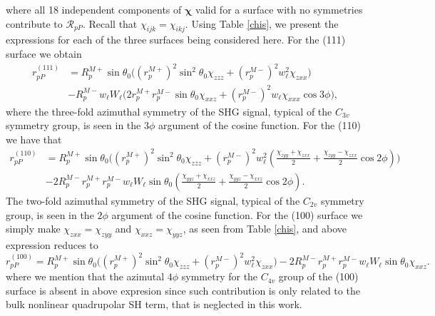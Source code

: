 where all 18 independent components of $\boldsymbol{\chi}$ valid for a surface
with no symmetries contribute to $\mathcal{R}_{pP}$. Recall that
$\chi_{ijk}=\chi_{ikj}$. Using Table \ref{chis}, we present the expressions for
each of the three surfaces being considered here. For the (111) surface we
obtain
\begin{equation}\label{rpp111}
\begin{split}
r^{(111)}_{pP} &= 
R^{M+}_{p}\sin\theta_{0}
\Big(
  \left(r^{M+}_{p}\right)^{2}\sin^{2}\theta_{0}\chi_{zzz}
+ \left(r^{M-}_{p}\right)^{2}w^{2}_{\ell}\chi_{zxx}
\Big)\\
&- R^{M-}_{p}w_{\ell}W_{\ell}
\Big(
  2r^{M+}_{p}r^{M-}_{p}\sin\theta_{0}\chi_{xxz}
+ \left(r^{M-}_{p}\right)^{2}w_{\ell}\chi_{xxx}\cos3\phi
\Big),
\end{split}
\end{equation}
where the three-fold azimuthal symmetry of the SHG signal, typical of the
$C_{3v}$ symmetry group, is seen in the $3\phi$ argument of the cosine function.
For the (110) we have that
\begin{equation}\label{eq:final-rpp.mr.110}
\begin{split}
r^{(110)}_{pP} &= 
R^{M+}_{p}\sin\theta_{0}
\bigg(
  \left(r^{M+}_{p}\right)^{2}\sin^{2}\theta_{0}\chi_{zzz}
+ \left(r^{M-}_{p}\right)^{2}w^{2}_{\ell}
\left(
\frac{\chi_{zyy} + \chi_{zxx}}{2} + \frac{\chi_{zyy} - \chi_{zxx}}{2}\cos2\phi 
\right) 
\bigg)\\
&- 2R^{M-}_{p}r^{M+}_{p}r^{M-}_{p}w_{\ell}W_{\ell}\sin\theta_{0}
\left(
\frac{\chi_{yyz} + \chi_{xxz}}{2} + \frac{\chi_{yyz} - \chi_{xxz}}{2}\cos2\phi 
\right). 
\end{split}
\end{equation}
The two-fold azimuthal symmetry of the SHG signal, typical of the $C_{2v}$
symmetry group, is seen in the $2\phi$ argument of the cosine function. For the
(100) surface we simply make $\chi_{zxx}=\chi_{zyy}$ and
$\chi_{xxz}=\chi_{yyz}$, as seen from Table \ref{chis}, and above expression
reduces to
\begin{equation}\label{rpp100}
r^{(100)}_{pP} = 
R^{M+}_{p}\sin\theta_{0}
\bigg(
  \left(r^{M+}_{p}\right)^{2}\sin^{2}\theta_{0}\chi_{zzz}
+ \left(r^{M-}_{p}\right)^{2}w^{2}_{\ell}\chi_{zxx}
\bigg)
-
2R^{M-}_{p}r^{M+}_{p}r^{M-}_{p}w_{\ell}W_{\ell}\sin\theta_{0}\chi_{xxz}
.
\end{equation}
where we mention that the azimutal $4\phi$ symmetry for the $C_{4v}$ group of
the (100) surface is absent in above expresion since such contribution is only
related to the bulk nonlinear quadrupolar SH term,\cite{sipePRB87} that is
neglected in this work.

